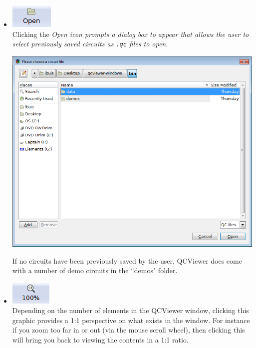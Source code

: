\documentclass[10pt]{article}
\theoremstyle{definition}
\begin{document}
\begin{itemize}
\item \includegraphics{Figures/Navigation/Open.png} \\ 

Clicking the \em Open \em icon prompts a dialog box to appear that allows the user to select 
previously saved circuits as \verb+.qc+ files to open.

\begin{center}
\includegraphics[scale=0.75]{Figures/Navigation/OpenDialog.png}
\end{center}

If no circuits have been previously saved by the user, QCViewer does come with a number of demo circuits in the ``demos" folder. 

\item \includegraphics{Figures/Navigation/Ratio.png}\\ 

Depending on the number of elements in the QCViewer window, clicking this graphic provides a 1:1 perspective on what exists in the window. For instance if you zoom too far in or out (via the mouse scroll wheel), then clicking this will bring you back to viewing the contents in a 1:1 ratio. 


\end{itemize}
\end{document}
